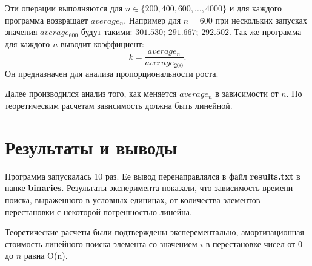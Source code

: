 \documentclass[a4paper,12pt] {report} 			%
\begin{document}
Эти операции выполняются для $n \in \{200, 400, 600, \ldots , 4000\}$ и для каждого программа возвращает $average_n$. Например для $n = 600$ при нескольких запусках значения $average_{600}$ будут такими: $301.530$; $291.667$; $292.502$. Так же программа для каждого $n$ выводит коэффициент: $$k=\frac{average_n}{average_{200}}.$$ Он предназначен для анализа пропорциональности роста.

Далее производился анализ того, как меняется $average_n$ в зависимости от $n$. По теоретическим расчетам зависимость должна быть линейной.

\section{Результаты и выводы}

Программа запускалась 10 раз. Ее вывод перенаправлялся в файл \textbf{results.txt} в папке \textbf{binaries}. Результаты эксперимента показали, что зависимость времени поиска, выраженного в условных единицах, от количества элементов перестановки с некоторой погрешностью линейна.

Теоретические расчеты были подтверждены эксперементально, амортизационная стоимость линейного поиска элемента со значением $i$ в перестановке чисел от $0$ до  $n$ равна O(n).
\end{document}
